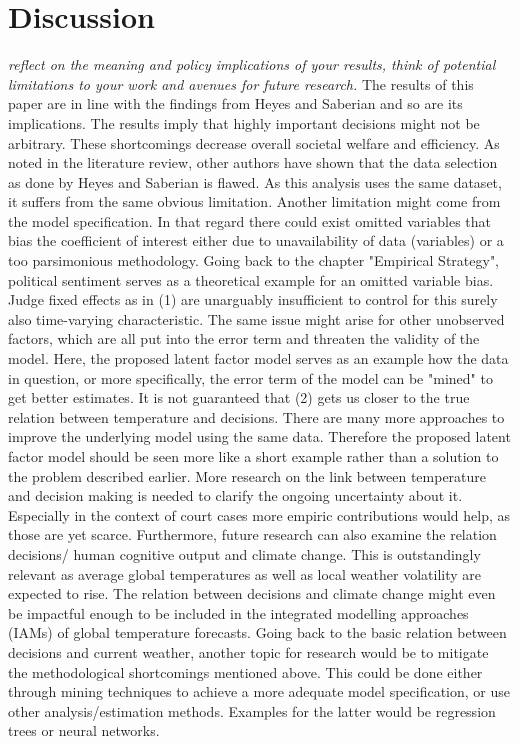 \documentclass[11pt]{article}
\begin{document}
	\section{Discussion}
	\textit{reflect on the meaning and policy implications of your results, think of potential limitations to your work and avenues for future research.}
	The results of this paper are in line with the findings from Heyes and Saberian and so are its implications. The results imply that highly important decisions might not be arbitrary. These shortcomings decrease overall societal welfare and efficiency.
	\newline As noted in the literature review, other authors have shown that the data selection as done by Heyes and Saberian is flawed. As this analysis uses the same dataset, it suffers from the same obvious limitation. Another limitation might come from the model specification. In that regard there could exist omitted variables that bias the coefficient of interest either due to unavailability of data (variables) or a too parsimonious methodology. Going back to the chapter "Empirical Strategy", political sentiment serves as a theoretical example for an omitted variable bias. Judge fixed effects as in (1) are unarguably insufficient to control for this surely also time-varying characteristic. The same issue might arise for other unobserved factors, which are all put into the error term and threaten the validity of the model. Here, the proposed latent factor model serves as an example how the data in question, or more specifically, the error term of the model can be "mined" to get better estimates. It is not guaranteed that (2) gets us closer to the true relation between temperature and decisions. There are many more approaches to improve the underlying model using the same data. Therefore the proposed latent factor model should be seen more like a short example rather than a solution to the problem described earlier.
	\newline More research on the link between temperature and decision making is needed to clarify the ongoing uncertainty about it. Especially in the context of court cases more empiric contributions would help, as those are yet scarce. Furthermore, future research can also examine the relation decisions/ human cognitive output and climate change. This is outstandingly relevant as average global temperatures as well as local weather volatility are expected to rise. The relation between decisions and climate change might even be impactful enough to be included in the integrated modelling approaches (IAMs) of global temperature forecasts. Going back to the basic relation between decisions and current weather, another topic for research would be to mitigate the methodological shortcomings mentioned above. This could be done either through mining techniques to achieve a more adequate model specification, or use other analysis/estimation methods. Examples for the latter would be regression trees or neural networks.
\end{document}
